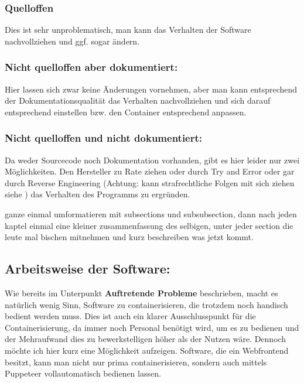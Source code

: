 \subsubsection{Quelloffen}
Dies ist sehr unproblematisch, man kann das Verhalten der Software nachvollziehen und ggf. sogar ändern.

\subsubsection{Nicht quelloffen aber dokumentiert:}
Hier lassen sich zwar keine Änderungen vornehmen, aber man kann entsprechend der Dokumentationsqualität das Verhalten nachvollziehen und sich darauf entsprechend einstellen bzw. den Container entsprechend anpassen.

\subsubsection{Nicht quelloffen und nicht dokumentiert:}
Da weder Sourcecode noch Dokumentation vorhanden, gibt es hier leider nur zwei Möglichkeiten.
Den Hersteller zu Rate ziehen oder durch Try and Error oder gar durch Reverse Engineering \cite{eilam2011reversing} (Achtung: kann strafrechtliche Folgen mit sich ziehen siehe \cite{Richtlinie}) das Verhalten des Programms zu ergründen.

ganze einmal umformatieren mit subsections und subsubsection, dann nach jeden kaptel einmal eine kleiner zusammenfassung des selbigen, unter jeder section die leute mal bischen mitnehmen und kurz beschreiben was jetzt kommt.

\subsection{Arbeitsweise der Software:}
Wie bereits im Unterpunkt \textbf{Auftretende Probleme} beschrieben, macht es natürlich wenig Sinn, Software zu containerisieren, die trotzdem noch handisch bedient werden muss.
Dies ist auch ein klarer Ausschlusspunkt für die Containerisierung, da immer noch Personal benötigt wird, um es zu bedienen und der Mehraufwand dies zu bewerkstelligen höher als der Nutzen wäre.
Dennoch möchte ich hier kurz eine Möglichkeit aufzeigen. Software, die ein Webfrontend besitzt, kann man nicht nur prima containerisieren, sondern auch mittels Puppeteer vollautomatisch bedienen lassen.

